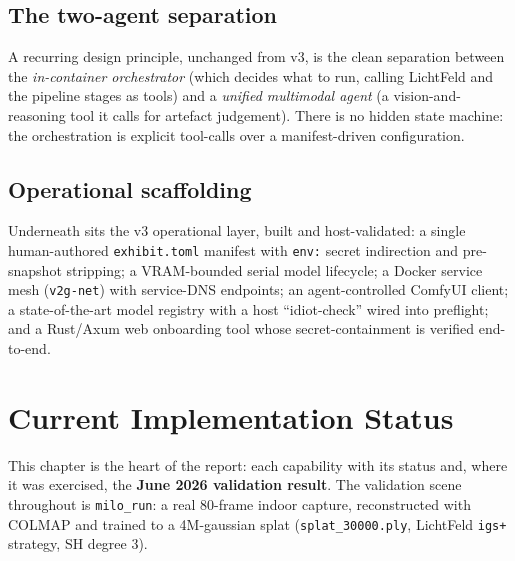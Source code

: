 \documentclass[a4paper,11pt]{report}
\newcommand{\code}[1]{\texttt{#1}}
\begin{document}
\section{The two-agent separation}
A recurring design principle, unchanged from v3, is the clean separation between the \emph{in-container
orchestrator} (which decides what to run, calling LichtFeld and the pipeline stages as tools) and a
\emph{unified multimodal agent} (a vision-and-reasoning tool it calls for artefact judgement). There is no
hidden state machine: the orchestration is explicit tool-calls over a manifest-driven configuration.

\section{Operational scaffolding}
Underneath sits the v3 operational layer, built and host-validated: a single human-authored
\code{exhibit.toml} manifest with \code{env:} secret indirection and pre-snapshot stripping; a
VRAM-bounded serial model lifecycle; a Docker service mesh (\code{v2g-net}) with service-DNS endpoints; an
agent-controlled ComfyUI client; a state-of-the-art model registry with a host ``idiot-check'' wired into
preflight; and a Rust/Axum web onboarding tool whose secret-containment is verified end-to-end.

\chapter{Current Implementation Status}

This chapter is the heart of the report: each capability with its status and, where it was exercised, the
\textbf{June 2026 validation result}. The validation scene throughout is \code{milo\_run}: a real
80-frame indoor capture, reconstructed with COLMAP and trained to a 4M-gaussian splat
(\code{splat\_30000.ply}, LichtFeld \code{igs+} strategy, SH degree 3).
\end{document}
